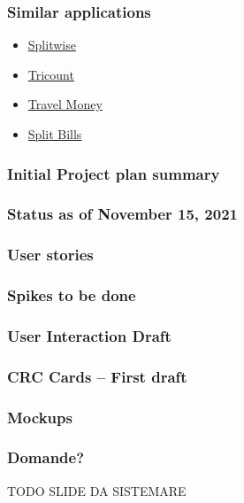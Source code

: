 \documentclass[11pt]{beamer}
\begin{document}
	\begin{frame}
		\frametitle{Similar applications}
		
		\begin{itemize}
			\item \href{https://play.google.com/store/apps/details?id=com.Splitwise.SplitwiseMobile&hl=en_US&gl=US}{Splitwise}
			\item \href{https://play.google.com/store/apps/details?id=com.tribab.tricount.android}{Tricount}
			\item \href{https://play.google.com/store/apps/details?id=org.marbot.travel.money.free}{Travel Money}
			\item \href{https://play.google.com/store/apps/details?id=com.jwang123.splitbills}{Split Bills}
		\end{itemize}
	\end{frame}

	\begin{frame}
		\frametitle{Initial Project plan summary}
	\end{frame}

	\begin{frame}
		\frametitle{Status as of November 15, 2021}
	\end{frame}
	
	\begin{frame}
		\frametitle{User stories}
	\end{frame}
	
	\begin{frame}
		\frametitle{Spikes to be done}
	\end{frame}
	
	\begin{frame}
		\frametitle{User Interaction Draft}
	\end{frame}
	
	\begin{frame}
		\frametitle{CRC Cards – First draft}
	\end{frame}
	
	\begin{frame}
		\frametitle{Mockups}
	\end{frame}

	\begin{frame}
		\frametitle{Domande?}
		TODO SLIDE DA SISTEMARE
	\end{frame}
\end{document}
